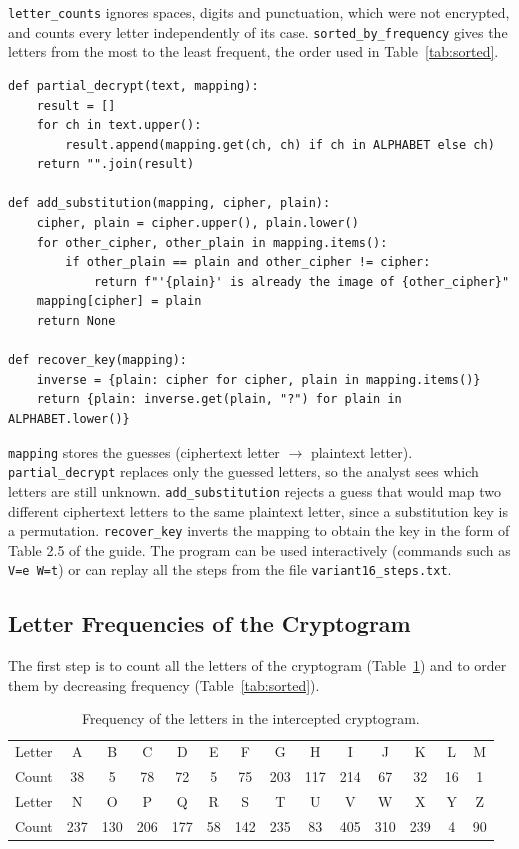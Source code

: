 \documentclass[12pt,a4paper]{article}
\begin{document}
\texttt{letter\_counts} ignores spaces, digits and punctuation, which were not encrypted,
and counts every letter independently of its case. \texttt{sorted\_by\_frequency} gives the
letters from the most to the least frequent, the order used in Table~\ref{tab:sorted}.

\begin{lstlisting}[caption={Applying the guesses and recovering the key}]
def partial_decrypt(text, mapping):
    result = []
    for ch in text.upper():
        result.append(mapping.get(ch, ch) if ch in ALPHABET else ch)
    return "".join(result)

def add_substitution(mapping, cipher, plain):
    cipher, plain = cipher.upper(), plain.lower()
    for other_cipher, other_plain in mapping.items():
        if other_plain == plain and other_cipher != cipher:
            return f"'{plain}' is already the image of {other_cipher}"
    mapping[cipher] = plain
    return None

def recover_key(mapping):
    inverse = {plain: cipher for cipher, plain in mapping.items()}
    return {plain: inverse.get(plain, "?") for plain in ALPHABET.lower()}
\end{lstlisting}

\texttt{mapping} stores the guesses (ciphertext letter $\rightarrow$ plaintext letter).
\texttt{partial\_decrypt} replaces only the guessed letters, so the analyst sees which
letters are still unknown. \texttt{add\_substitution} rejects a guess that would map two
different ciphertext letters to the same plaintext letter, since a substitution key is a
permutation. \texttt{recover\_key} inverts the mapping to obtain the key in the form of
Table 2.5 of the guide. The program can be used interactively (commands such as
\texttt{V=e W=t}) or can replay all the steps from the file \texttt{variant16\_steps.txt}.

\subsection{Letter Frequencies of the Cryptogram}

The first step is to count all the letters of the cryptogram (Table~\ref{tab:counts}) and
to order them by decreasing frequency (Table~\ref{tab:sorted}).

\begin{table}[H]
  \centering
  \caption{Frequency of the letters in the intercepted cryptogram.}
  \label{tab:counts}
  \setlength{\tabcolsep}{4pt}
  \small
  \begin{tabular}{l*{13}{c}}
    \toprule
    Letter & A & B & C & D & E & F & G & H & I & J & K & L & M \\
    Count  & 38 & 5 & 78 & 72 & 5 & 75 & 203 & 117 & 214 & 67 & 32 & 16 & 1 \\
    \midrule
    Letter & N & O & P & Q & R & S & T & U & V & W & X & Y & Z \\
    Count  & 237 & 130 & 206 & 177 & 58 & 142 & 235 & 83 & 405 & 310 & 239 & 4 & 90 \\
    \bottomrule
  \end{tabular}
\end{table}
\end{document}
